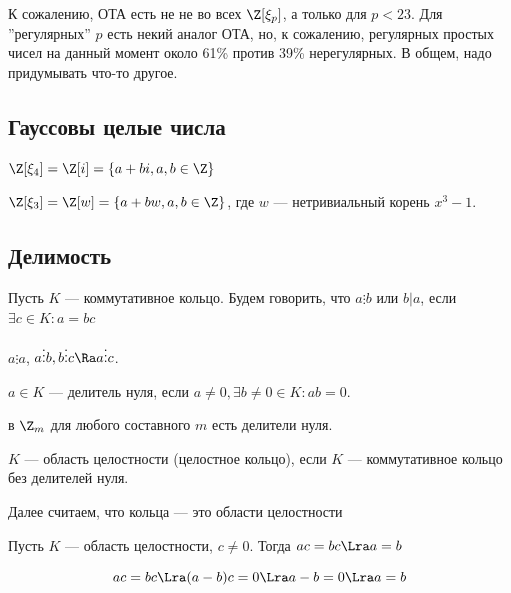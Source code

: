 К сожалению, ОТА есть не не во всех \(\Z[\xi_p]\), а только для \(p < 23\). Для ''регулярных'' \(p\) есть некий аналог ОТА, но, к сожалению, регулярных простых чисел на данный момент около 61\% против 39\% нерегулярных. В общем, надо придумывать что-то другое.

\subsection{Гауссовы целые числа}
\begin{example}
    \(\Z[\xi_4] = \Z[i] = \{a + bi, a, b \in \Z\}\)
\end{example}

\begin{example}
    \(\Z[\xi_3] = \Z[w] = \{a + bw, a, b \in \Z\}\), где \(w\) --- нетривиальный корень \(x^3 - 1\).
\end{example}

\subsection{Делимость}
\begin{definition}
    Пусть \(K\) --- коммутативное кольцо. Будем говорить, что \(a \vdots b\) или \(b | a\), если \(\exists c \in K: a = bc\)
\end{definition}

\begin{note}
    \(a \vdots a\), \(a \vdots b, b \vdots c \Ra a \vdots c\).
\end{note}

\begin{definition}
    \(a \in K\) --- делитель нуля, если \(a \ne 0, \exists b \ne 0 \in K: ab = 0\).
\end{definition}

\begin{note}
    в \(\Z_m\) для любого составного \(m\) есть делители нуля.
\end{note}

\begin{definition}
    \(K\) --- область целостности (целостное кольцо), если \(K\) --- коммутативное кольцо без делителей нуля.
\end{definition}

Далее считаем, что кольца --- это области целостности

\begin{proposition}
    Пусть \(K\) --- область целостности, \(c \ne 0\). Тогда \(ac = bc \Lra a = b\)
\end{proposition}
\begin{proposition}
    \[ac = bc \Lra (a - b)c = 0 \Lra a - b = 0 \Lra a = b\]
\end{proposition}


